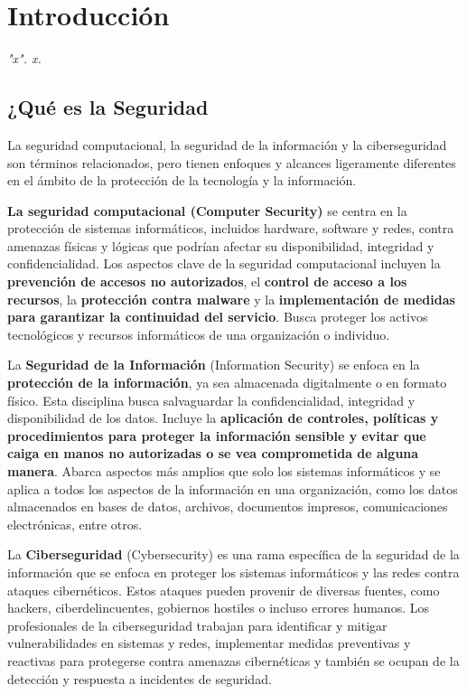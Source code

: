 \chapter{Introducción}
\vspace{95px}
\begin{flushright}
    \textit{\textit{"x"}. x.}
\end{flushright}



\section{¿Qué es la Seguridad}


La {seguridad computacional}, la seguridad de la información y la ciberseguridad son términos relacionados, pero tienen enfoques y alcances ligeramente diferentes en el ámbito de la protección de la tecnología y la información. 

\textbf{La seguridad computacional  (Computer Security)} se centra en la protección de sistemas informáticos, incluidos hardware, software y redes, contra amenazas físicas y lógicas que podrían afectar su disponibilidad, integridad y confidencialidad. Los aspectos clave de la seguridad computacional incluyen la \textbf{prevención de accesos no autorizados}, el \textbf{control de acceso a los recursos}, la \textbf{protección contra malware} y la \textbf{implementación de medidas para garantizar la continuidad del servicio}.
Busca proteger los activos tecnológicos y recursos informáticos de una organización o individuo.

La \textbf{Seguridad de la Información} (Information Security) se enfoca en la \textbf{protección de la información}, ya sea almacenada digitalmente o en formato físico. Esta disciplina busca salvaguardar la confidencialidad, integridad y disponibilidad de los datos. Incluye la \textbf{aplicación de controles, políticas y procedimientos para proteger la información sensible y evitar que caiga en manos no autorizadas o se vea comprometida de alguna manera}. Abarca aspectos más amplios que solo los sistemas informáticos y se aplica a todos los aspectos de la información en una organización, como los datos almacenados en bases de datos, archivos, documentos impresos, comunicaciones electrónicas, entre otros.

La \textbf{{Ciberseguridad}} (Cybersecurity) es una rama específica de la seguridad de la información que se enfoca en proteger los sistemas informáticos y las redes contra ataques cibernéticos. Estos ataques pueden provenir de diversas fuentes, como hackers, ciberdelincuentes, gobiernos hostiles o incluso errores humanos.
%
Los profesionales de la ciberseguridad trabajan para identificar y mitigar vulnerabilidades en sistemas y redes, implementar medidas preventivas y reactivas para protegerse contra amenazas cibernéticas y también se ocupan de la detección y respuesta a incidentes de seguridad.

